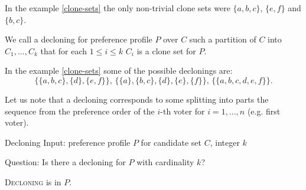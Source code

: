 \begin{exmp}
In the example \ref{clone-sets} the only non-trivial clone sets were
$\{a,b,c\}$, $\{e,f\}$ and $\{b,c\}$.
\end{exmp}

\begin{defn}[decloning]
We call a decloning for preference profile $P$ over $C$
such a partition of $C$  into $C_1, ... , C_k$
that for each $1 \leq i \leq k$ $C_i$ is a clone set for $P$.
\end{defn}

\begin{exmp}
In the example \ref{clone-sets} some of the possible declonings are:
$$
\big\{ \{a,b,c\}, \{d\}, \{e,f\} \big\} \text{, }
\big\{ \{a\}, \{b,c\}, \{d\}, \{e\}, \{f\} \big\} \text{, }
\big\{ \{a,b,c,d,e,f\} \big\} \text{.}
$$
\end{exmp}

\begin{rmrk} \label{sequence-split}
Let us note that a decloning corresponds to some splitting into parts
the sequence from the preference order of the $i$-th voter for $i=1,...,n$ (e.g. first voter).
\end{rmrk}


\begin{problem}{Decloning}
    Input: preference profile $P$ for candidate set $C$, integer $k$

    Question: Is there a decloning for $P$ with cardinality $k$?
\end{problem}

\begin{thm}
\textsc{Decloning} is in $P$.
\end{thm}

